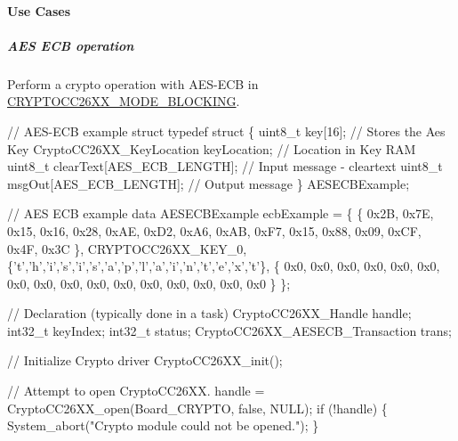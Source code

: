 \paragraph*{Use Cases\label{_crypto_c_c26_x_x_8h_CRYPTO_USE_CASES}%
\hypertarget{_crypto_c_c26_x_x_8h_CRYPTO_USE_CASES}{}%
}

\subparagraph*{A\+E\+S E\+C\+B operation}

Perform a crypto operation with A\+E\+S-\/\+E\+C\+B in \hyperlink{_crypto_c_c26_x_x_8h_abf86c8ac428559f00fed3299d439e2cdaf0a9faf35a12d014c5f3a475906a3373}{C\+R\+Y\+P\+T\+O\+C\+C26\+X\+X\+\_\+\+M\+O\+D\+E\+\_\+\+B\+L\+O\+C\+K\+I\+N\+G}.


\begin{DoxyCode}
\textcolor{comment}{// AES-ECB example struct}
\textcolor{keyword}{typedef} \textcolor{keyword}{struct}
\{
  uint8\_t key[16];                      \textcolor{comment}{// Stores the Aes Key}
  CryptoCC26XX_KeyLocation keyLocation; \textcolor{comment}{// Location in Key RAM}
  uint8\_t clearText[AES\_ECB\_LENGTH];    \textcolor{comment}{// Input message - cleartext}
  uint8\_t msgOut[AES\_ECB\_LENGTH];       \textcolor{comment}{// Output message}
\} AESECBExample;

\textcolor{comment}{// AES ECB example data}
AESECBExample ecbExample =
\{
  \{ 0x2B, 0x7E, 0x15, 0x16, 0x28, 0xAE, 0xD2, 0xA6,
  0xAB, 0xF7, 0x15, 0x88, 0x09, 0xCF, 0x4F, 0x3C \},
  CRYPTOCC26XX_KEY_0,
  \{\textcolor{charliteral}{'t'},\textcolor{charliteral}{'h'},\textcolor{charliteral}{'i'},\textcolor{charliteral}{'s'},\textcolor{charliteral}{'i'},\textcolor{charliteral}{'s'},\textcolor{charliteral}{'a'},\textcolor{charliteral}{'p'},\textcolor{charliteral}{'l'},\textcolor{charliteral}{'a'},\textcolor{charliteral}{'i'},\textcolor{charliteral}{'n'},\textcolor{charliteral}{'t'},\textcolor{charliteral}{'e'},\textcolor{charliteral}{'x'},\textcolor{charliteral}{'t'}\},
  \{ 0x0, 0x0, 0x0, 0x0, 0x0, 0x0, 0x0, 0x0, 0x0, 0x0, 0x0, 0x0, 0x0, 0x0, 0x0, 0x0 \}
\};

\textcolor{comment}{// Declaration (typically done in a task)}
CryptoCC26XX_Handle             handle;
int32\_t                         keyIndex;
int32\_t                                                 status;
CryptoCC26XX_AESECB_Transaction trans;

\textcolor{comment}{// Initialize Crypto driver}
CryptoCC26XX_init();


\textcolor{comment}{// Attempt to open CryptoCC26XX.}
handle = CryptoCC26XX_open(Board\_CRYPTO, \textcolor{keyword}{false}, NULL);
\textcolor{keywordflow}{if} (!handle) \{
  System\_abort(\textcolor{stringliteral}{"Crypto module could not be opened."});
\}


\end{DoxyCode}
